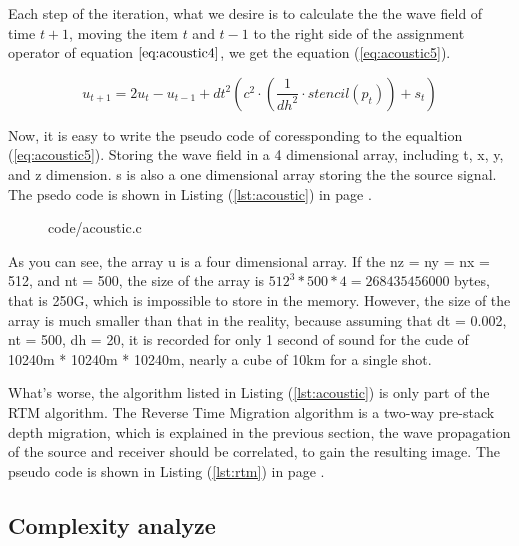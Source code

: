 Each step of the iteration, what we desire is to calculate the the wave
field of time \( t + 1 \), moving the item \( t \) and \(t-1\) to the right
side of the assignment operator of equation \(\ref{eq:acoustic4}\), we get
the equation (\ref{eq:acoustic5}).

\begin{equation}
  u_{t+1} =
  2u_{t} - u_{t-1} +  dt^2 \left( c^2\cdot\left( \frac{1}{dh^2} \cdot stencil\left( p_t \right) \right)
 +s_t\right)
  \label{eq:acoustic5}
\end{equation}

Now, it is easy to write the pseudo code of coressponding to the equaltion
(\ref{eq:acoustic5}). Storing the wave field in a 4 dimensional array,
including t, x, y, and z dimension. s is also a one dimensional array
storing the the source signal. The psedo code is shown in Listing
(\ref{lst:acoustic}) in page \pageref{lst:acoustic}.

\begin{figure}
  \centering
  
  {code/acoustic.c}
\end{figure}

As you can see, the array u is a four dimensional array. If the nz = ny =
nx = 512, and nt = 500, the size of the array is \( 512^3 * 500 * 4 =
268435456000 \) bytes, that is 250G, which is impossible to store in the
memory. However, the size of the array is much smaller than that in the
reality, because assuming that dt = 0.002, nt = 500, dh = 20, it is recorded for
only 1 second of sound for the cude of 10240m * 10240m * 10240m, nearly a
cube of 10km for a single shot.

What's worse, the algorithm listed in Listing (\ref{lst:acoustic}) is only
part of the RTM algorithm. The Reverse Time Migration algorithm is a
two-way pre-stack depth migration, which is explained in the previous
section, the wave propagation of the source and receiver should be
correlated, to gain the resulting image. The pseudo code\cite{fu11} is shown in
Listing (\ref{lst:rtm}) in page \pageref{lst:rtm}.

\begin{figure}[h]
  \centering
  
\end{figure}

\subsection{Complexity analyze}

